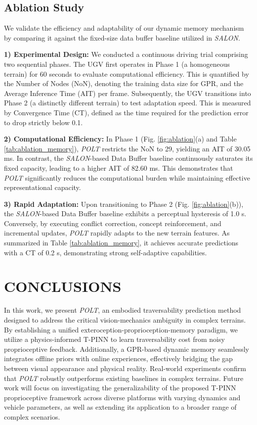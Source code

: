 \documentclass[letterpaper, 10 pt, conference]{ieeeconf}  %
\begin{document}
\subsection{Ablation Study}

We validate the efficiency and adaptability of our dynamic memory mechanism by comparing it against the fixed-size data buffer baseline utilized in \textit{SALON}.

\textbf{1) Experimental Design:} We conducted a continuous driving trial comprising two sequential phases. The UGV first operates in Phase 1 (a homogeneous terrain) for 60 seconds to evaluate computational efficiency. This is quantified by the Number of Nodes (NoN), denoting the training data size for GPR, and the Average Inference Time (AIT) per frame. Subsequently, the UGV transitions into Phase 2 (a distinctly different terrain) to test adaptation speed. This is measured by Convergence Time (CT), defined as the time required for the prediction error to drop strictly below 0.1.

\textbf{2) Computational Efficiency:} In Phase 1 (Fig. \ref{fig:ablation}(a) and Table \ref{tab:ablation_memory}), \textit{POLT} restricts the NoN to 29, yielding an AIT of 30.05 ms. In contrast, the \textit{SALON}-based Data Buffer baseline continuously saturates its fixed capacity, leading to a higher AIT of 82.60 ms. This demonstrates that \textit{POLT} significantly reduces the computational burden while maintaining effective representational capacity.

\textbf{3) Rapid Adaptation:} Upon transitioning to Phase 2 (Fig. \ref{fig:ablation}(b)), the \textit{SALON}-based Data Buffer baseline exhibits a perceptual hysteresis of 1.0 s. Conversely, by executing conflict correction, concept reinforcement, and incremental updates, \textit{POLT} rapidly adapts to the new terrain features. As summarized in Table \ref{tab:ablation_memory}, it achieves accurate predictions with a CT of 0.2 s, demonstrating strong self-adaptive capabilities.


\section{CONCLUSIONS}

In this work, we present \textit{POLT}, an embodied traversability prediction method designed to address the critical vision-mechanics ambiguity in complex terrains. By establishing a unified exteroception-proprioception-memory paradigm, we utilize a physics-informed T-PINN to learn traversability cost from noisy proprioceptive feedback. Additionally, a GPR-based dynamic memory seamlessly integrates offline priors with online experiences, effectively bridging the gap between visual appearance and physical reality. Real-world experiments confirm that \textit{POLT} robustly outperforms existing baselines in complex terrains. Future work will focus on investigating the generalizability of the proposed T-PINN proprioceptive framework across diverse platforms with varying dynamics and vehicle parameters, as well as extending its application to a broader range of complex scenarios.
\end{document}
